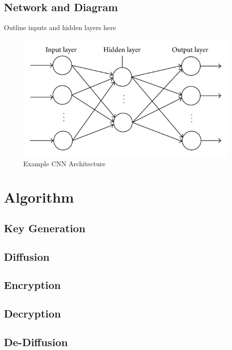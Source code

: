 \documentclass[conference]{IEEEtran}
\begin{document}
\subsection{Network and Diagram}\label{subsec:network-and-diagram}

Outline inputs and hidden layers here

\begin{figure}[!ht]
    \centering
    \includegraphics{figures/CNN}
    \caption{Example CNN Architecture}
    \label{fig:CNN}
\end{figure}

\section{Algorithm}\label{sec:algorithm}

\subsection{Key Generation}\label{subsec:key-generation}

\subsection{Diffusion}\label{subsec:diffusion}

\subsection{Encryption}\label{subsec:encryption}

\subsection{Decryption}\label{subsec:decryption}

\subsection{De-Diffusion}\label{subsec:de-diffusion}
\end{document}
